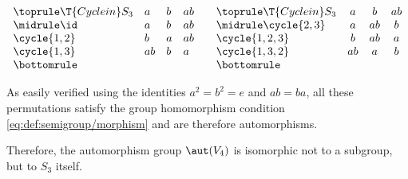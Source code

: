 \begin{example}
\begin{thmenum}
    \begin{table}
      \begin{equation*}
        \begin{array}{l l l l}
          \toprule
          \T{Cycle in} S_3 & a  & b  & ab \\
          \midrule
          \id              & a  & b  & ab \\
          \cycle{ 1, 2 }   & b  & a  & ab \\
          \cycle{ 1, 3 }   & ab & b  & a  \\
          \bottomrule
        \end{array}
        \quad
        \begin{array}{l c c c}
          \toprule
          \T{Cycle in} S_3  & a  & b  & ab \\
          \midrule
          \cycle{ 2, 3 }    & a  & ab & b  \\
          \cycle{ 1, 2, 3 } & b  & ab & a  \\
          \cycle{ 1, 3, 2 } & ab & a  & b  \\
          \bottomrule
        \end{array}
      \end{equation*}
      \caption{Isomorphisms of the \hyperref[def:klein_four_group]{Klein four-group} \( V_4 \)}\label{tab:ex:def:automorphism_group/v4}
    \end{table}

    As easily verified using the identities \( a^2 = b^2 = e \) and \( ab = ba \), all these permutations satisfy the group homomorphism condition \eqref{eq:def:semigroup/morphism} and are therefore automorphisms.

    Therefore, the automorphism group \( \aut(V_4) \) is isomorphic not to a subgroup, but to \( S_3 \) itself.
  \end{thmenum}
\end{example}

